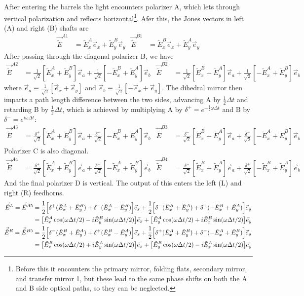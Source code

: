 \documentclass{article}
\newcommand{\rtwo}{\frac{1}{\sqrt{2}}}
\newcommand{\rtd}{\frac{\delta^+}{\sqrt{2}}}
\newcommand{\rtc}{\frac{\delta^-}{\sqrt{2}}}
\newcommand{\J}{{\tilde E}}
\begin{document}
After entering the barrels the light encounters polarizer A, which lets through
vertical polarization and reflects horizontal\footnote{
	Before this it encounters the primary mirror, folding flats, secondary mirror,
	and transfer mirror 1, but these lead to the same phase shifts on both
	the A and B side optical paths, so they can be neglected.}. Afer this,
the Jones vectors in left (A) and right (B) shafts are
\begin{align}
	\vec \J^{A1} &= \J^A_x \vec e_x + \J^B_y \vec e_y &
	\vec \J^{B1} &= \J^B_x \vec e_x + \J^A_y \vec e_y
\end{align}
After passing through the diagonal polarizer B, we have
\begin{align}
	\vec \J^{A2} &= \rtwo [\J^A_x+\J^B_y]\vec e_a + \rtwo[-\J^B_x+\J^A_y]\vec e_b &
	\vec \J^{B2} &= \rtwo [\J^B_x+\J^A_y]\vec e_a + \rtwo[-\J^A_x+\J^B_y]\vec e_b
\end{align}
where $\vec e_a \equiv \rtwo [\vec e_x + \vec e_y]$ and $\vec e_b
\equiv \rtwo [-\vec e_x + \vec e_y]$. The dihedral mirror then
imparts a path length difference between the two sides, advancing
A by $\frac12\Delta t$ and retarding B by $\frac12\Delta t$, which
is achieved by multiplying A by $\delta^+ = e^{-\frac12\omega\Delta t}$
and B by $\delta^- = e^{i\omega\Delta t}$:
\begin{align}
	\vec \J^{A3} &= \rtd [\J^A_x+\J^B_y]\vec e_a + \rtd[-\J^B_x+\J^A_y]\vec e_b &
	\vec \J^{B3} &= \rtc [\J^B_x+\J^A_y]\vec e_a + \rtc[-\J^A_x+\J^B_y]\vec e_b
\end{align}
Polarizer C is also diagonal.
\begin{align}
	\vec \J^{A4} &= \rtd [\J^A_x+\J^B_y]\vec e_a + \rtc [-\J^A_x+\J^B_y]\vec e_b &
	\vec \J^{B4} &= \rtc [\J^B_x+\J^A_y]\vec e_a + \rtd [-\J^B_x+\J^A_y]\vec e_b
\end{align}
And the final polarizer D is vertical. The output of this enters
the left (L) and right (R) feedhorns.
\begin{align}
	\vec \J^L = \vec \J^{A5} &= \frac12 \Big[\delta^+(\J^A_x+\J^B_y)+\delta^-(\J^A_x-\J^B_y)\Big]\vec e_x
		+ \frac12 \Big[\delta^-(\J^B_x+\J^A_y)+\delta^+(-\J^B_x+\J^A_y)\Big]\vec e_y \notag \\
		&= \big[\J^A_x\cos(\omega\Delta t/2) - i\J^B_y\sin(\omega\Delta t/2)\big]\vec e_x
		+  \big[\J^A_y\cos(\omega\Delta t/2) + i\J^B_x\sin(\omega\Delta t/2)\big]\vec e_y \\
	\vec \J^R = \vec \J^{B5} &= \frac12 \Big[\delta^-(\J^B_x+\J^A_y)+\delta^+(\J^B_x-\J^A_y)\Big]\vec e_x
		+ \frac12 \Big[\delta^+(\J^A_x+\J^B_y)+\delta^-(-\J^A_x+\J^B_y)\Big]\vec e_y \notag \\
		&= \big[\J^B_x\cos(\omega\Delta t/2) + i\J^A_y\sin(\omega\Delta t/2)\big]\vec e_x
		+  \big[\J^B_y\cos(\omega\Delta t/2) - i\J^A_x\sin(\omega\Delta t/2)\big]\vec e_y
\end{align}
\end{document}

